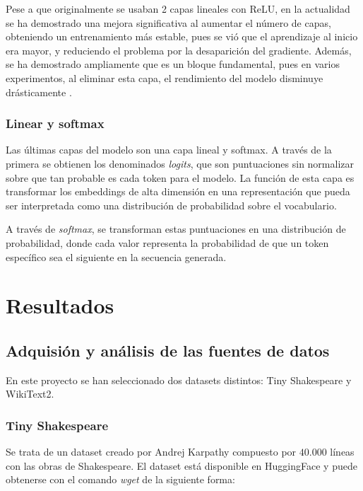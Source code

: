 \documentclass[11pt]{book}
\newcommand{\clearemptydoublepage}{\newpage{\pagestyle{empty}\cleardoublepage}}
\begin{document}
Pese a que originalmente se usaban 2 capas lineales con ReLU, en la actualidad se ha demostrado una mejora significativa al aumentar el número de capas, obteniendo un entrenamiento más estable, pues se vió que el aprendizaje al inicio era mayor, y reduciendo el problema por la desaparición del gradiente. Además, se ha demostrado ampliamente que es un bloque fundamental, pues en varios experimentos, al eliminar esta capa, el rendimiento del modelo disminuye drásticamente \parencite{gerber2025ffn}.

\subsection{Linear y softmax}
Las últimas capas del modelo son una capa lineal y softmax. A través de la primera se obtienen los denominados \textit{logits}, que son puntuaciones sin normalizar sobre que tan probable es cada token para el modelo. La función de esta capa es transformar los embeddings de alta dimensión en una representación que pueda ser interpretada como una distribución de probabilidad sobre el vocabulario.

A través de \textit{softmax}, se transforman estas puntuaciones en una distribución de probabilidad, donde cada valor representa la probabilidad de que un token específico sea el siguiente en la secuencia generada. 


\clearemptydoublepage

\chapter{Resultados}

\section{Adquisión y análisis de las fuentes de datos}
En este proyecto se han seleccionado dos datasets distintos: Tiny Shakespeare y WikiText2.

\subsection{Tiny Shakespeare}
Se trata de un dataset creado por Andrej Karpathy compuesto por $40.000$ líneas con las obras de Shakespeare. El dataset está disponible en HuggingFace \parencite{huggingface_tinyshakespeare} y puede obtenerse con el comando \textit{wget} de la siguiente forma:
\end{document}
